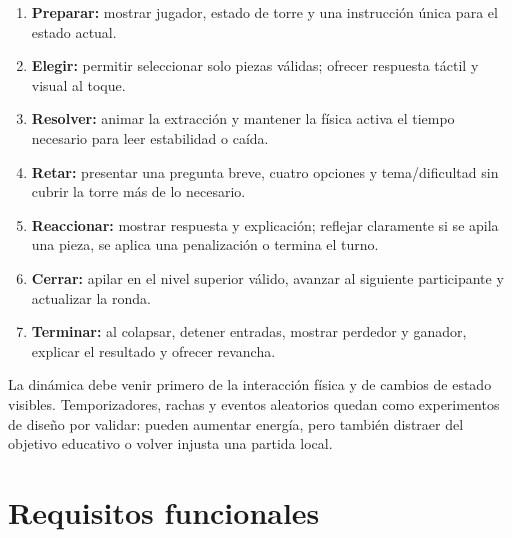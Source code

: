 \documentclass[11pt,letterpaper]{article}
\begin{document}
\begin{enumerate}
  \item \textbf{Preparar:} mostrar jugador, estado de torre y una instrucción única para el estado actual.
  \item \textbf{Elegir:} permitir seleccionar solo piezas válidas; ofrecer respuesta táctil y visual al toque.
  \item \textbf{Resolver:} animar la extracción y mantener la física activa el tiempo necesario para leer estabilidad o caída.
  \item \textbf{Retar:} presentar una pregunta breve, cuatro opciones y tema/dificultad sin cubrir la torre más de lo necesario.
  \item \textbf{Reaccionar:} mostrar respuesta y explicación; reflejar claramente si se apila una pieza, se aplica una penalización o termina el turno.
  \item \textbf{Cerrar:} apilar en el nivel superior válido, avanzar al siguiente participante y actualizar la ronda.
  \item \textbf{Terminar:} al colapsar, detener entradas, mostrar perdedor y ganador, explicar el resultado y ofrecer revancha.
\end{enumerate}

La dinámica debe venir primero de la interacción física y de cambios de estado visibles. Temporizadores, rachas y eventos aleatorios quedan como experimentos de diseño por validar: pueden aumentar energía, pero también distraer del objetivo educativo o volver injusta una partida local.

\section{Requisitos funcionales}
\end{document}
